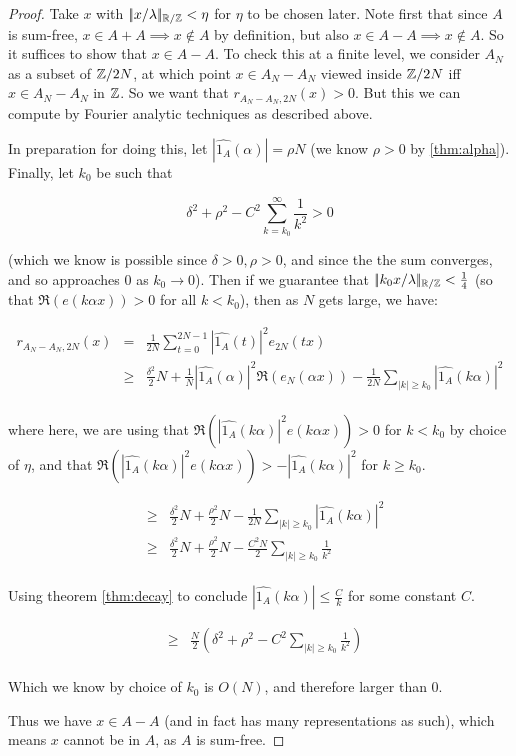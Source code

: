 \documentclass{article}
\theoremstyle{definition}
\theoremstyle{remark}
\numberwithin{equation}{section}
\begin{document}
\begin{proof}
  Take $x$ with $|\!|x/\lambda|\!|_{\mathbb{R}/\mathbb{Z}} < \eta$ for $\eta$ to be chosen
  later.  Note first that since $A$ is sum-free,
  $x \in A+A \implies x \notin A$ by definition, but also
  $x \in A-A \implies x \notin A$.  So it suffices to show that
  $x \in A-A$.  To check this at a finite level, we consider $A_N$ as
  a subset of $\mathbb{Z}/2N$, at which point $x \in A_N - A_N$ viewed inside
  $\mathbb{Z}/2N$ iff $x \in A_N - A_N$ in $\mathbb{Z}$.  So we want that
  $r_{A_N-A_N,2N}(x) > 0$.  But this we can compute by Fourier
  analytic techniques as described above.

  In preparation for doing this, let
  $|\widehat{1_A}(\alpha)| = \rho N$ (we know $\rho > 0$ by
  \ref{thm:alpha}).  Finally, let $k_0$ be such that

  \[\delta^2 + \rho^2 - C^2 \sum_{k=k_0}^\infty \frac{1}{k^2} > 0\]

  (which we know is possible since $\delta > 0, \rho > 0$, and since
  the the sum converges, and so approaches 0 as $k_0 \to 0$).  Then if
  we guarantee that $|\!|k_0 x/\lambda|\!|_{\mathbb{R}/\mathbb{Z}} < \frac14$ (so that
  $\Re(e(k\alpha x)) > 0$ for all $k < k_0$), then as $N$ gets large, we
  have:

  \begin{eqnarray*}
    r_{A_N - A_N,2N}(x) &=& \frac{1}{2N} \sum_{t=0}^{2N-1} |\widehat{1_A}(t)|^2 e_{2N}(tx)\\
                        &\geq& \frac{\delta^2}{2} N + \frac{1}{N} |\widehat{1_A}(\alpha)|^2 \Re(e_N(\alpha x))
                               - \frac{1}{2N} \sum_{|k| \geq k_0}
                               |\widehat{1_A}(k\alpha)|^2\\
  \end{eqnarray*}

  where here, we are using that
  $\Re(|\widehat{1_A}(k\alpha)|^2 e(k\alpha x)) > 0$ for $k < k_0$ by
  choice of $\eta$, and that
  $\Re(|\widehat{1_A}(k\alpha)|^2 e(k\alpha x)) >
  -|\widehat{1_A}(k\alpha)|^2$ for $k \geq k_0$.

  \begin{eqnarray*}
    &\geq& \frac{\delta^2}{2} N + \frac{\rho^2}{2} N
           - \frac{1}{2N} \sum_{|k| \geq k_0} |\widehat{1_A}(k\alpha)|^2\\
    &\geq& \frac{\delta^2}{2} N + \frac{\rho^2}{2} N
           - \frac{C^2 N}{2} \sum_{|k| \geq k_0}
           \frac{1}{k^2}\\
  \end{eqnarray*}


  Using theorem \ref{thm:decay} to conclude
  $|\widehat{1_A}(k\alpha)| \leq \frac{C}{k}$ for some constant $C$.

  \begin{eqnarray*}
    &\geq& \frac{N}{2}\left(\delta^2 + \rho^2 - C^2 \sum_{|k| \geq k_0} \frac{1}{k^2}\right)\\
  \end{eqnarray*}
  
  Which we know by choice of $k_0$ is $O(N)$, and therefore larger
  than 0.

  Thus we have $x \in A - A$ (and in fact has many representations as
  such), which means $x$ cannot be in $A$, as $A$ is sum-free.
\end{proof}
\end{document}
